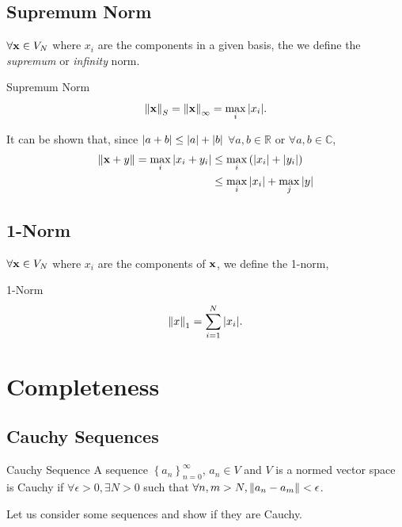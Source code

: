 \documentclass{book}
\begin{document}
\subsection{Supremum Norm}
$\forall \vb{x} \in V_N$ where $x_i$ are the components in a given basis, the we define the \textit{supremum} or \textit{infinity} norm.
\begin{Definitions}{Supremum Norm}{}
	\begin{equation}
		\norm{\vb{x}}_S = \norm{\vb{x}}_{\infty} = \max_i\abs{x_i}.
	\end{equation}
\end{Definitions}
It can be shown that, since $\abs{a + b} \leq \abs{a} + \abs{b}$ $\forall a,b \in \mathbb{R}$ or $\forall a,b \in \mathbb{C}$,
\begin{equation}
	\begin{split}
		\norm{\vb{x} + {y}} = \max_i\abs{x_i + y_i} & \leq \max_i\left(\abs{x_i} + \abs{y_i}\right) \\
		& \leq \max_i\abs{x_i} + \max_j\abs{y}
	\end{split}
\end{equation}
\subsection{1-Norm}
$\forall \vb{x} \in V_N$ where $x_i$ are the components of $\vb{x}$, we define the 1-norm,
\begin{Definitions}{1-Norm}{}
	\begin{equation}
		\norm{x}_1 = \sum_{i=1}^N \abs{x_i}.
	\end{equation}
\end{Definitions}
\section{Completeness}
\subsection{Cauchy Sequences}
\begin{Definitions}{Cauchy Sequence}{}
	A sequence $\left\{a_n\right\}_{n=0}^{\infty}$, $a_n \in V$ and $V$ is a normed vector space is Cauchy if $\forall \epsilon > 0, \exists N > 0$ such that $\forall n,m > N, \norm{a_n - a_m} < \epsilon$.
\end{Definitions}{}{}
Let us consider some sequences and show if they are Cauchy.
\end{document}
